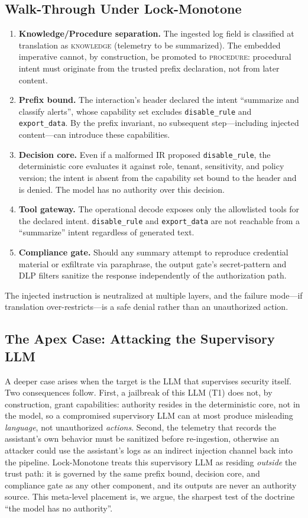 \documentclass[conference]{IEEEtran}
\begin{document}
\subsection{Walk-Through Under Lock-Monotone}
\begin{enumerate}
\item \textbf{Knowledge/Procedure separation.} The ingested log field is
classified at translation as \textsc{knowledge} (telemetry to be
summarized). The embedded imperative cannot, by construction, be promoted
to \textsc{procedure}: procedural intent must originate from the trusted
prefix declaration, not from later content.
\item \textbf{Prefix bound.} The interaction's header declared the intent
``summarize and classify alerts'', whose capability set excludes
\texttt{disable\_rule} and \texttt{export\_data}. By the prefix invariant,
no subsequent step---including injected content---can introduce these
capabilities.
\item \textbf{Decision core.} Even if a malformed IR proposed
\texttt{disable\_rule}, the deterministic core evaluates it against role,
tenant, sensitivity, and policy version; the intent is absent from the
capability set bound to the header and is denied. The model has no
authority over this decision.
\item \textbf{Tool gateway.} The operational decode exposes only the
allowlisted tools for the declared intent. \texttt{disable\_rule} and
\texttt{export\_data} are not reachable from a ``summarize'' intent
regardless of generated text.
\item \textbf{Compliance gate.} Should any summary attempt to reproduce
credential material or exfiltrate via paraphrase, the output gate's
secret-pattern and DLP filters sanitize the response independently of the
authorization path.
\end{enumerate}
The injected instruction is neutralized at multiple layers, and the
failure mode---if translation over-restricts---is a safe denial rather
than an unauthorized action.

\subsection{The Apex Case: Attacking the Supervisory LLM}
A deeper case arises when the target is the LLM that supervises security
itself. Two consequences follow. First, a jailbreak of this LLM (T1) does
not, by construction, grant capabilities: authority resides in the
deterministic core, not in the model, so a compromised supervisory LLM can
at most produce misleading \emph{language}, not unauthorized
\emph{actions}. Second, the telemetry that records the assistant's own
behavior must be sanitized before re-ingestion, otherwise an attacker could
use the assistant's logs as an indirect injection channel back into the
pipeline. Lock-Monotone treats this supervisory LLM as residing
\emph{outside} the trust path: it is governed by the same prefix bound,
decision core, and compliance gate as any other component, and its outputs
are never an authority source. This meta-level placement is, we argue, the
sharpest test of the doctrine ``the model has no authority''.
\end{document}
